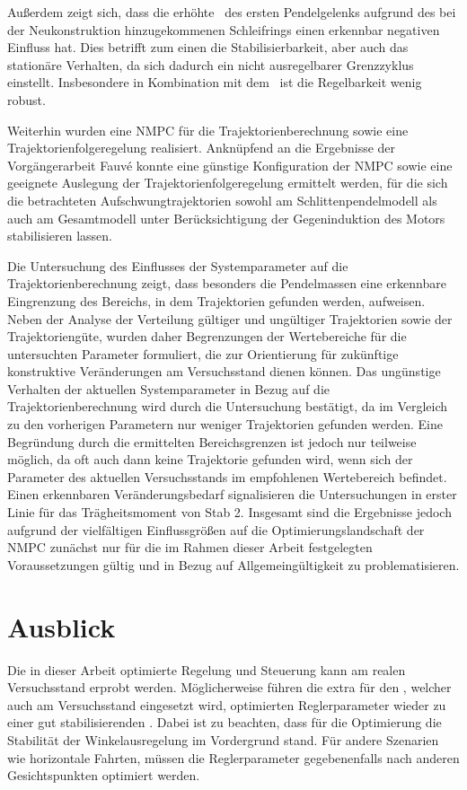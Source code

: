 Außerdem zeigt sich, dass die erhöhte \crb\ des ersten Pendelgelenks aufgrund des bei der Neukonstruktion hinzugekommenen Schleifrings einen erkennbar negativen Einfluss hat.
Dies betrifft zum einen die Stabilisierbarkeit, aber auch das stationäre Verhalten, da sich dadurch ein nicht ausregelbarer Grenzzyklus einstellt.
Insbesondere in Kombination mit dem \beob\ ist die Regelbarkeit wenig robust.

Weiterhin wurden eine NMPC für die Trajektorienberechnung sowie eine Trajektorienfolgeregelung realisiert. Anknüpfend an die Ergebnisse der Vorgängerarbeit Fauvé \cite{fauve} konnte eine günstige Konfiguration der NMPC sowie eine geeignete Auslegung der Trajektorienfolgeregelung ermittelt werden, für die sich die betrachteten Aufschwungtrajektorien sowohl am Schlittenpendelmodell als auch am Gesamtmodell unter Berücksichtigung der Gegeninduktion des Motors stabilisieren lassen.

Die Untersuchung des Einflusses der Systemparameter auf die Trajektorienberechnung zeigt, dass besonders die Pendelmassen eine erkennbare Eingrenzung des Bereichs, in dem Trajektorien gefunden werden, aufweisen. Neben der Analyse der Verteilung gültiger und ungültiger Trajektorien sowie der Trajektoriengüte, wurden daher Begrenzungen der Wertebereiche für die untersuchten Parameter formuliert, die zur Orientierung für zukünftige konstruktive Veränderungen am Versuchsstand dienen können. 
Das ungünstige Verhalten der aktuellen Systemparameter in Bezug auf die Trajektorienberechnung wird durch die Untersuchung bestätigt, da im Vergleich zu den vorherigen Parametern nur weniger Trajektorien gefunden werden.
Eine Begründung durch die ermittelten Bereichsgrenzen ist jedoch nur teilweise möglich, da oft auch dann keine Trajektorie gefunden wird, wenn sich der Parameter des aktuellen Versuchsstands im empfohlenen Wertebereich befindet. Einen erkennbaren Veränderungsbedarf signalisieren die Untersuchungen in erster Linie für das Trägheitsmoment von Stab 2. 
Insgesamt sind die Ergebnisse jedoch aufgrund der vielfältigen Einflussgrößen auf die Optimierungslandschaft der NMPC zunächst nur für die im Rahmen dieser Arbeit festgelegten Voraussetzungen gültig und in Bezug auf Allgemeingültigkeit zu problematisieren. 

  

\section{Ausblick}

Die in dieser Arbeit optimierte Regelung und Steuerung kann am realen Versuchsstand erprobt werden.
Möglicherweise führen die extra für den \beob, welcher auch am Versuchsstand eingesetzt wird, optimierten Reglerparameter wieder zu einer gut stabilisierenden \aprg.
Dabei ist zu beachten, dass für die Optimierung die Stabilität der Winkelausregelung im Vordergrund stand.
Für andere Szenarien wie horizontale Fahrten, müssen die Reglerparameter gegebenenfalls nach anderen Gesichtspunkten optimiert werden.

